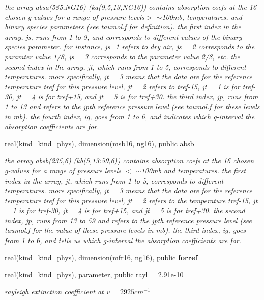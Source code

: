 \begin{Indent}
\begin{DoxyCompactItemize}
\begin{DoxyCompactList}\small\item\em the array absa(585,\+N\+G16) (ka(9,5,13,\+N\+G16)) contains absorption coefs at the 16 chosen g-\/values for a range of pressure levels$>$ $\sim$100mb, temperatures, and binary species parameters (see taumol.\+f for definition). the first index in the array, js, runs from 1 to 9, and corresponds to different values of the binary species parameter. for instance, js=1 refers to dry air, js = 2 corresponds to the paramter value 1/8, js = 3 corresponds to the parameter value 2/8, etc. the second index in the array, jt, which runs from 1 to 5, corresponds to different temperatures. more specifically, jt = 3 means that the data are for the reference temperature tref for this pressure level, jt = 2 refers to tref-\/15, jt = 1 is for tref-\/30, jt = 4 is for tref+15, and jt = 5 is for tref+30. the third index, jp, runs from 1 to 13 and refers to the jpth reference pressure level (see taumol.\+f for these levels in mb). the fourth index, ig, goes from 1 to 6, and indicates which g-\/interval the absorption coefficients are for. \end{DoxyCompactList}\item 
real(kind=kind\+\_\+phys), dimension(\hyperlink{group__module__radsw__kgbnn_ga2ce1ab36897fb1fc7d85cbf7fe539e59}{msb16}, ng16), public \hyperlink{group__module__radsw__kgbnn_gafe8639128e4f7a48f133b7399addcb79}{absb}
\begin{DoxyCompactList}\small\item\em the array absb(235,6) (kb(5,13\+:59,6)) contains absorption coefs at the 16 chosen g-\/values for a range of pressure levels $<$ $\sim$100mb and temperatures. the first index in the array, jt, which runs from 1 to 5, corresponds to different temperatures. more specifically, jt = 3 means that the data are for the reference temperature tref for this pressure level, jt = 2 refers to the temperature tref-\/15, jt = 1 is for tref-\/30, jt = 4 is for tref+15, and jt = 5 is for tref+30. the second index, jp, runs from 13 to 59 and refers to the jpth reference pressure level (see taumol.\+f for the value of these pressure levels in mb). the third index, ig, goes from 1 to 6, and tells us which g-\/interval the absorption coefficients are for. \end{DoxyCompactList}\item 
real(kind=kind\+\_\+phys), dimension(\hyperlink{group__module__radsw__kgbnn_gaeee3fe8e44f6fbd9a6a008bc9f97f37c}{mfr16}, ng16), public {\bfseries forref}
\item 
real(kind=kind\+\_\+phys), parameter, public \hyperlink{group__module__radsw__kgbnn_ga27964e0300eb686acf1ed3c8459d3810}{rayl} = 2.\+91e-\/10
\begin{DoxyCompactList}\small\item\em rayleigh extinction coefficient at v = $2925 cm^{-1}$ \end{DoxyCompactList}\end{DoxyCompactItemize}
\end{Indent}
